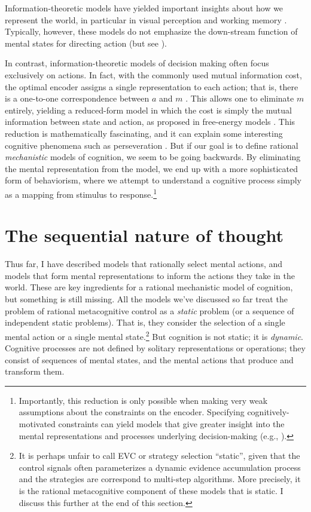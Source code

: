 Information-theoretic models have yielded important insights about how we represent the world, in particular in visual perception \citep{attneave1954informational,barlow1961possible,simoncelli2001natural} and working memory \citep{sims2012ideal,vandenberg2018resourcerational}. Typically, however, these models do not emphasize the down-stream function of mental states for directing action (but see \citealp{yoo2018strategic,bates2019adaptive}).

In contrast, information-theoretic models of decision making often focus exclusively on actions. In fact, with the commonly used mutual information cost, the optimal encoder assigns a single representation to each action; that is, there is a one-to-one correspondence between $a$ and $m$ \citep{matejka2015rational}. This allows one to eliminate $m$ entirely, yielding a reduced-form model in which the cost is simply the mutual information between state and action, as proposed in free-energy models \citep{friston2010freeenergy,ortega2013thermodynamics}. This reduction is mathematically fascinating, and it can explain some interesting cognitive phenomena such as perseveration \citep{gershman2020origin}. But if our goal is to define rational \emph{mechanistic} models of cognition, we seem to be going backwards. By eliminating the mental representation from the model, we end up with a more sophisticated form of behaviorism, where we attempt to understand a cognitive process simply as a mapping from stimulus to response.\footnote{%
  Importantly, this reduction is only possible when making very weak assumptions about the constraints on the encoder. Specifying cognitively-motivated constraints can yield models that give greater insight into the mental representations and processes underlying decision-making (e.g., \citealp{bhui2018decision}).
}

\section{The sequential nature of thought}\label{sec:intro-sequential}

Thus far, I have described models that rationally select mental actions, and models that form mental representations to inform the actions they take in the world. These are key ingredients for a rational mechanistic model of cognition, but something is still missing. All the models we've discussed so far treat the problem of rational metacognitive control as a \emph{static} problem (or a sequence of independent static problems). That is, they consider the selection of a single mental action or a single mental state.\footnote{%
  It is perhaps unfair to call EVC or strategy selection ``static'', given that the control signals often parameterizes a dynamic evidence accumulation process and the strategies are correspond to multi-step algorithms. More precisely, it is the rational metacognitive component of these models that is static. I discuss this further at the end of this section.
} But cognition is not static; it is \emph{dynamic}. Cognitive processes are not defined by solitary representations or operations; they consist of sequences of mental states, and the mental actions that produce and transform them.


